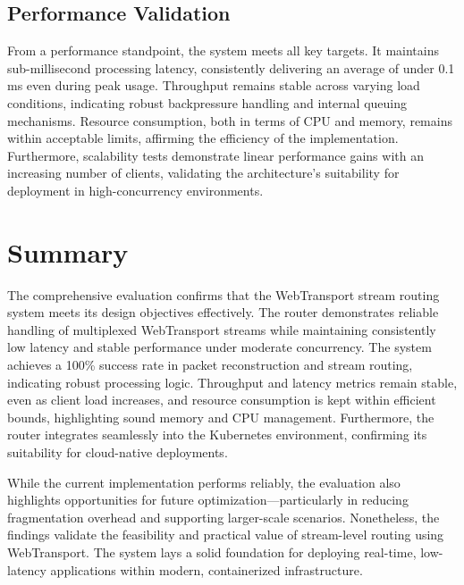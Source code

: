 \subsection{Performance Validation}

From a performance standpoint, the system meets all key targets. It maintains sub-millisecond processing latency, consistently delivering an average of under 0.1 ms even during peak usage. Throughput remains stable across varying load conditions, indicating robust backpressure handling and internal queuing mechanisms. Resource consumption, both in terms of CPU and memory, remains within acceptable limits, affirming the efficiency of the implementation. Furthermore, scalability tests demonstrate linear performance gains with an increasing number of clients, validating the architecture's suitability for deployment in high-concurrency environments.


\section{Summary}

The comprehensive evaluation confirms that the WebTransport stream routing system meets its design objectives effectively. The router demonstrates reliable handling of multiplexed WebTransport streams while maintaining consistently low latency and stable performance under moderate concurrency. The system achieves a 100\% success rate in packet reconstruction and stream routing, indicating robust processing logic. Throughput and latency metrics remain stable, even as client load increases, and resource consumption is kept within efficient bounds, highlighting sound memory and CPU management. Furthermore, the router integrates seamlessly into the Kubernetes environment, confirming its suitability for cloud-native deployments.

While the current implementation performs reliably, the evaluation also highlights opportunities for future optimization—particularly in reducing fragmentation overhead and supporting larger-scale scenarios. Nonetheless, the findings validate the feasibility and practical value of stream-level routing using WebTransport. The system lays a solid foundation for deploying real-time, low-latency applications within modern, containerized infrastructure.